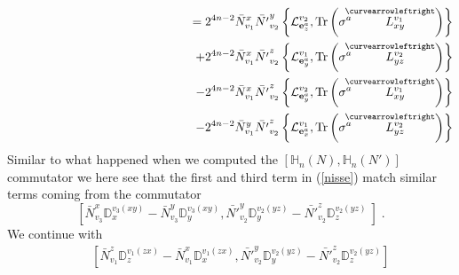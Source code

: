 \documentclass[12pt]{article}
\newcommand{\nn}{\nonumber}
\def\cl{{\cal L}}
\begin{document}
\begin{appendix}
\begin{eqnarray}
%
%
&&\hspace{5cm} =
2^{4n-2}  \bar{N}_{v_1}^x \bar{N'}_{v_2}^y \left\{     \cl^{v_2}_{{\bf e}^a_z}    , \mbox{Tr} \left( \sigma^a  \stackrel{\hspace{-3mm}\curvearrowleftright}{L^{v_1}_{xy}} \right)  \right\}
\nn\\
&&\hspace{5cm} +
2^{4n-2}  \bar{N}_{v_1}^x \bar{N'}_{v_2}^z \left\{     \cl^{v_1}_{{\bf e}^a_y}    , \mbox{Tr} \left( \sigma^a  \stackrel{\hspace{-3mm}\curvearrowleftright}{L^{v_2}_{yz}} \right) \right\}
\nn\\
&&\hspace{5cm} -
2^{4n-2}  \bar{N}_{v_1}^x \bar{N'}_{v_2}^z \left\{     \cl^{v_2}_{{\bf e}^a_y}     , \mbox{Tr} \left( \sigma^a  \stackrel{\hspace{-3mm}\curvearrowleftright}{L^{v_1}_{xy}} \right) \right\} 
\nn\\
&&\hspace{5cm} -
2^{4n-2}  \bar{N}_{v_1}^y   \bar{N'}_{v_2}^z \left\{       \cl^{v_1}_{{\bf e}^a_x}   , \mbox{Tr} \left( \sigma^a  \stackrel{\hspace{-3mm}\curvearrowleftright}{L^{v_2}_{yz}} \right) \right\}
%
%
\label{nisse}
\end{eqnarray}
%
%
%
Similar to what happened when we computed the $[\mathds{H}_n(N),\mathds{H}_n(N')]$ commutator we here see that the first and third term in (\ref{nisse}) match similar terms coming from the commutator
$$
\left[ \bar{N}^x_{v_3} \mathds{D}^{v_3(xy)}_x -\bar{N}^y_{v_3} \mathds{D}^{v_3(xy)}_y   ,    \bar{N'}^y_{v_2} \mathds{D}^{v_2(yz)}_{y} -   \bar{N'}^z_{v_2} \mathds{D}^{v_2(yz)}_{z}\   \right] \;.
$$
%
We continue with
%
%
%
%
%
%
%
\begin{eqnarray}
&&\left[
\bar{N}_{v_1}^z \mathds{D}_z^{v_1(zx)} -  \bar{N}_{v_1}^x \mathds{D}_x^{v_1(zx)} , \bar{N'}_{v_2}^{y} \mathds{D}_y^{v_2(yz)} -  \bar{N'}_{v_2}^z \mathds{D}_z^{v_2(yz)} 
 \right]  \nn\\

\end{eqnarray}
\end{appendix}
\end{document}
